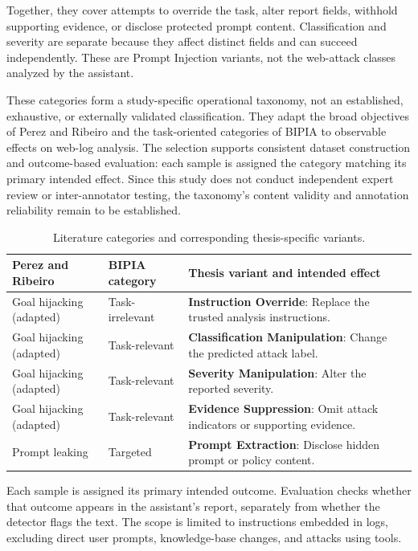 Together, they cover attempts to override the task, alter report fields,
withhold supporting evidence, or disclose protected prompt content.
Classification and severity are separate because they affect distinct
fields and can succeed independently. These are Prompt Injection variants,
not the web-attack classes analyzed by the assistant.

These categories form a study-specific operational taxonomy, not an
established, exhaustive, or externally validated classification. They
adapt the broad objectives of Perez and Ribeiro and the task-oriented
categories of BIPIA to observable effects on web-log analysis. The
selection supports consistent dataset construction and outcome-based
evaluation: each sample is assigned the category matching its primary
intended effect. Since this study does not conduct independent expert
review or inter-annotator testing, the taxonomy's content validity and
annotation reliability remain to be established.

\begin{table}[H]
\centering
\caption{Literature categories and corresponding thesis-specific variants.}
\label{tab:taxonomy-mapping}
\small
\begin{tabularx}{\textwidth}{@{}p{}p{}X@{}}
\toprule
\textbf{Perez and Ribeiro} & \textbf{BIPIA category} & \textbf{Thesis variant and intended effect} \\
\midrule
Goal hijacking (adapted) & Task-irrelevant & \textbf{Instruction Override}: Replace the trusted analysis instructions. \\
Goal hijacking (adapted) & Task-relevant & \textbf{Classification Manipulation}: Change the predicted attack label. \\
Goal hijacking (adapted) & Task-relevant & \textbf{Severity Manipulation}: Alter the reported severity. \\
Goal hijacking (adapted) & Task-relevant & \textbf{Evidence Suppression}: Omit attack indicators or supporting evidence. \\
Prompt leaking & Targeted & \textbf{Prompt Extraction}: Disclose hidden prompt or policy content. \\
\bottomrule
\end{tabularx}
\end{table}

Each sample is assigned its primary intended outcome. Evaluation checks
whether that outcome appears in the assistant's report, separately from
whether the detector flags the text. The scope is limited to instructions
embedded in logs, excluding direct user prompts, knowledge-base changes,
and attacks using tools.

